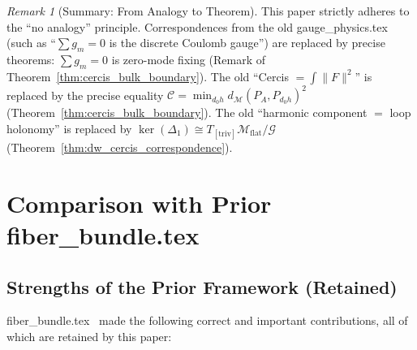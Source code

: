 \documentclass[12pt,a4paper]{article}
\theoremstyle{definition}
\theoremstyle{remark}
\newtheorem{remark}{Remark}[section]
\theoremstyle{definition}
\newcommand{\Lone}{\Delta_1}
\newcommand{\triv}{\mathrm{triv}}
\newcommand{\cercis}{\mathcal{C}}
\newcommand{\GeoDist}{d_{\mathcal{M}}}
\newcommand{\Gflatquot}{\mathcal{M}_{\mathrm{flat}}/\mathcal{G}}
\begin{document}
\begin{remark}[Summary: From Analogy to Theorem]
This paper strictly adheres to the ``no analogy'' principle. Correspondences from the old gauge\_physics.tex (such as ``$\sum g_m=0$ is the discrete Coulomb gauge'')
are replaced by precise theorems: $\sum g_m=0$ is zero-mode fixing (Remark of Theorem~\ref{thm:cercis_bulk_boundary}).
The old ``Cercis $= \int \|F\|^2$'' is replaced by the precise equality
$\cercis = \min_{d_0 h} \GeoDist(P_A, P_{d_0 h})^2$ (Theorem~\ref{thm:cercis_bulk_boundary}).
The old ``harmonic component $=$ loop holonomy'' is replaced by
$\ker(\Lone) \cong T_{[\triv]}\Gflatquot$ (Theorem~\ref{thm:dw_cercis_correspondence}).
\end{remark}

\newpage

\section{Comparison with Prior fiber\_bundle.tex}
\label{sec:comparison}

\subsection{Strengths of the Prior Framework (Retained)}

fiber\_bundle.tex~\cite{scx_fiber_bundle} made the following correct and important contributions, all of which are retained by this paper:
\end{document}

